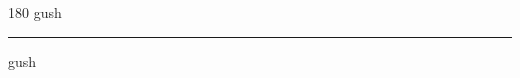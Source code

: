 
\begin{frame}
\begin{center}
\begin{turn}{180}
{\fontsize{2.5cm}{1em}\selectfont gush}
\end{turn}
\vspace{1em}\par  
\hrule
\vspace{1em}\par  
{\fontsize{2.5cm}{1em}\selectfont gush}
\end{center}
\end{frame}
